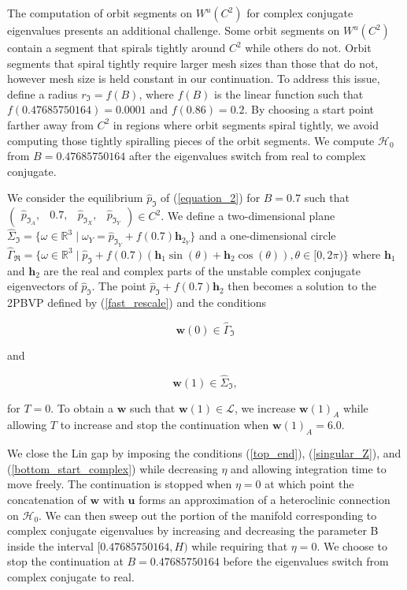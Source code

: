 \documentclass{ws-ijbc}
\begin{document}
The computation of orbit segments on $W^u(C^2)$ for complex conjugate eigenvalues presents an additional challenge.  Some orbit segments on $W^u(C^2)$ contain a segment that spirals tightly around $C^2$ while others do not.  Orbit segments that spiral tightly require larger mesh sizes than those that do not, however mesh size is held constant in our continuation.  To address this issue, define a radius $r_{\Im} =  f(B)$, where $f(B)$ is the linear function such that $f(0.47685750164)=0.0001$ and $f(0.86)=0.2$.  By choosing a start point farther away from $C^2$ in regions where orbit segments spiral tightly, we avoid computing those tightly spiralling pieces of the orbit segments.  We compute $\mathscr{H}_0$ from $B=0.47685750164$ after the eigenvalues switch from real to complex conjugate.

We consider the equilibrium $\hat{p}_{\Im}$ of (\ref{equation_2}) for $B=0.7$ such that $\begin{pmatrix} \hat{p}_{\Im_A},& 0.7,&\hat{p}_{\Im_X},&\hat{p}_{\Im_Y} \end{pmatrix} \in C^2$.  We define a two-dimensional plane $\widehat{\Sigma}_{\Im} = \{ \omega \in \mathbb{R}^3  \; | \; \omega_Y = \hat{p}_{\Im_Y} + f(0.7) \mathbf{h}_{2_Y} \}$ and a one-dimensional circle $\widehat{\Gamma}_{\Re}= \{ \omega \in \mathbb{R}^3  \; | \; \hat{p}_{\Im} + f(0.7)(\mathbf{h}_1\sin(\theta) + \mathbf{h}_2\cos(\theta)), \theta \in [0,2\pi) \}$  where $\mathbf{h}_1$ and $\mathbf{h}_2$ are the real and complex parts of the unstable complex conjugate eigenvectors of $\hat{p}_{\Im}$.  The point $\hat{p}_{\Im} + f(0.7)\mathbf{h}_2$ then becomes a solution to the 2PBVP defined by (\ref{fast_rescale}) and the conditions

\begin{equation}
	\mathbf{w}(0) \in \widehat{\Gamma}_{\Im}
	\label{bottom_start_complex}
\end{equation}

and

\begin{equation}
	\mathbf{w}(1) \in \widehat{\Sigma}_{\Im},
\end{equation}

\noindent
for $T=0$.  To obtain a $\mathbf{w}$ such that $\mathbf{w}(1) \in \mathscr{L}$, we increase $\mathbf{w}(1)_A$ while allowing $T$ to increase and stop the continuation when $\mathbf{w}(1)_A=6.0$.

We close the Lin gap by imposing the conditions (\ref{top_end}), (\ref{singular_Z}), and (\ref{bottom_start_complex}) while decreasing $\eta$ and allowing integration time to move freely.  The continuation is stopped when $\eta=0$ at which point the concatenation of $\mathbf{w}$ with $\mathbf{u}$ forms an approximation of a heteroclinic connection on $\mathscr{H}_0$.  We can then sweep out the portion of the manifold corresponding to complex conjugate eigenvalues by increasing and decreasing the parameter B inside the interval $[0.47685750164, H)$ while requiring that $\eta=0$.  We choose to stop the continuation at $B=0.47685750164$ before the eigenvalues switch from complex conjugate to real.
\end{document}
